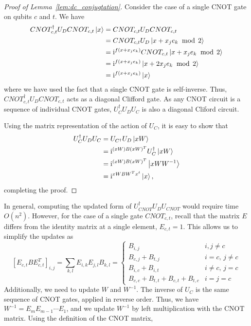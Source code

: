 \begin{proof}[Proof of Lemma~\ref{lem:dc_conjugtation}]
Consider the case of a single CNOT gate on qubits $c$ and $t$. We have
\begin{align}
CNOT_{c,t}^{\dagger} U_{D} CNOT_{c,t}\ket{x} &= CNOT_{c,t} U_{D} CNOT_{c,t} \nonumber \\
&= CNOT_{c,t} U_{D} \ket{x + x_{j}e_{k}\;\bmod\,2} \nonumber \\
&= \mathrm{i}^{f(x + x_{j}e_{k})} CNOT_{c,t} \ket{x + x_{j}e_{k}\;\bmod\,2} \nonumber \\
&= \mathrm{i}^{f(x + x_{j}e_{k})} \ket{x + 2x_{j}e_{k}\;\bmod\,2} \nonumber \\
&= \mathrm{i}^{f(x+x_{j}e_{k})}\ket{x}
\end{align}
where we have used the fact that a single CNOT gate is self-inverse. Thus, $CNOT_{c,t}^{\dagger}U_{D}CNOT_{c,t}$ acts as a diagonal Clifford gate. As any CNOT circuit is a sequence of individual CNOT gates, $U_{C}^{\dagger}U_{D}U_{C}$ is also a diagonal Cliford circuit.\par
Using the matrix representation of the action of $U_{C}$, it is easy to show that
\begin{align}
U_{C}^{\dagger}U_{D}U_{C} &= U_{C^{\dagger}}U_{D}\ket{xW} \nonumber \\
&= \mathrm{i}^{(xW)B(xW)^{T}}U_{C}^{\dagger}\ket{xW} \nonumber \\
&= \mathrm{i}^{(xW)B(xW)^{T}}\ket{xWW^{-1}} \nonumber \\
&= \mathrm{i}^{xWBW^{T}x^{t}}\ket{x},
\label{eq:cdc}
\end{align}
completing the proof.
\end{proof}
In general, computing the updated form of $U_{CNOT}^{\dagger}U_{D}U_{CNOT}$ would require time $O(n^{2})$. However, for the case of a single gate $CNOT_{c,t}$, recall that the matrix $E$ differs from the identity matrix at a single element, $E_{c,t}=1$. This allows us to simplify the updates as
\begin{equation}
\label{eq:cnot_phaseupdate}
\left[E_{c,t}BE_{c,t}^{T}\right]_{i,j} = \sum_{k,l}E_{i,k}E_{j,l}B_{k,l} =
\begin{cases}
B_{i,j} & i,j\neq c \\
B_{c,j}+B_{t,j} & i=c,\,j\neq c\\
B_{i,c}+B_{i,t} & i\neq c,\,j=c\\
B_{c,c}+B_{t,t} + B_{c,t} + B_{t,c} & i=j=c
\end{cases}
\end{equation}
Additionally, we need to update $W$ and $W^{-1}$. The inverse of $U_{C}$ is the same sequence of CNOT gates, applied in reverse order. Thus, we have $W^{-1}=E_{m}E_{m-1}\cdots E_{1}$, and we update $W^{-1}$ by left multiplication with the CNOT matrix. Using the definition of the CNOT matrix,
